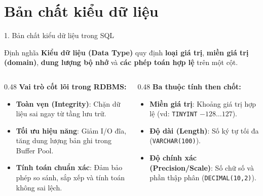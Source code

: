 \documentclass[aspectratio=169,11pt]{beamer}
\newcommand{\kw}[1]{\textcolor{dbblue}{\textbf{#1}}}
\newcommand{\smallgap}{\vspace{0.25em}}
\begin{document}
\section{Bản chất kiểu dữ liệu}
\begin{frame}{1. Bản chất kiểu dữ liệu trong SQL}
\begin{block}{Định nghĩa}
  \textbf{Kiểu dữ liệu (Data Type)} quy định \kw{loại giá trị}, \kw{miền giá trị (domain)}, \kw{dung lượng bộ nhớ} và \kw{các phép toán hợp lệ} trên một cột.
\end{block}

\smallgap
\begin{columns}[t]
  \begin{column}{0.48\textwidth}
    \textbf{Vai trò cốt lõi trong RDBMS:}
    \begin{itemize}\setlength{\itemsep}{1.5pt}
      \item \kw{Toàn vẹn (Integrity)}: Chặn dữ liệu sai ngay từ tầng lưu trữ.
      \item \kw{Tối ưu hiệu năng}: Giảm I/O đĩa, tăng dung lượng bản ghi trong Buffer Pool.
      \item \kw{Tính toán chuẩn xác}: Đảm bảo phép so sánh, sắp xếp và tính toán không sai lệch.
    \end{itemize}
  \end{column}
  \begin{column}{0.48\textwidth}
    \textbf{Ba thuộc tính then chốt:}
    \begin{itemize}\setlength{\itemsep}{1.5pt}
      \item \kw{Miền giá trị}: Khoảng giá trị hợp lệ (vd: \texttt{TINYINT} $-128 \dots 127$).
      \item \kw{Độ dài (Length)}: Số ký tự tối đa (\texttt{VARCHAR(100)}).
      \item \kw{Độ chính xác (Precision/Scale)}: Số chữ số và phần thập phân (\texttt{DECIMAL(10,2)}).
    \end{itemize}
  \end{column}
\end{columns}
\end{frame}
\end{document}
